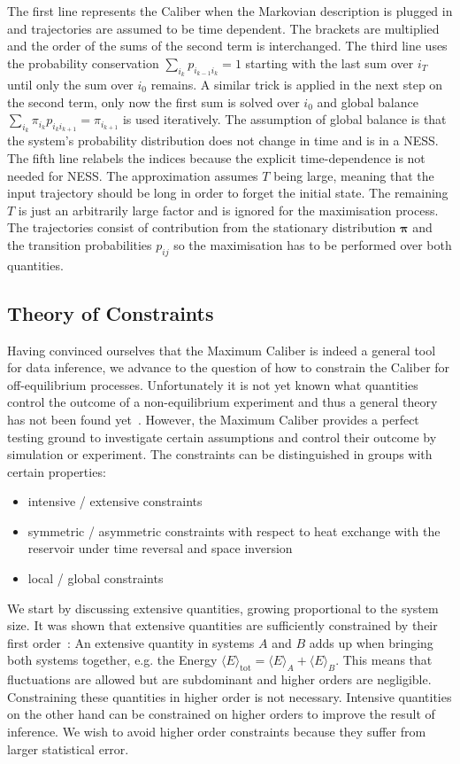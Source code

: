 The first line represents the Caliber when the Markovian description is plugged in and trajectories are assumed to be time dependent. The brackets are multiplied and the order of the sums of the second term is interchanged. The third line uses the probability conservation $\sum_{i_{k}} p_{i_{k-1} i_{k}} =1$ starting with the last sum over $i_T$ until only the sum over $i_0$ remains. A similar trick is applied in the next step on the second term, only now the first sum is solved over $i_0$ and global balance $\sum_{i_{k}} \pi_{i_k} p_{i_{k} i_{k+1}} = \pi_{i_{k+1}}$ is used iteratively. The assumption of global balance is that the system's probability distribution does not change in time and is in a NESS. The fifth line relabels the indices because the explicit time-dependence is not needed for NESS. The approximation assumes $T$ being large, meaning that the input trajectory should be long in order to forget the initial state. The remaining $T$ is just an arbitrarily large factor and is ignored for the maximisation process. The trajectories consist of contribution from the stationary distribution $\bm{\pi}$ and the transition probabilities $p_{ij}$ so the maximisation has to be performed over both quantities.  


\subsection{Theory of Constraints}
Having convinced ourselves that the Maximum Caliber is indeed a general tool for data inference, we advance to the question of how to constrain the Caliber for off-equilibrium processes. Unfortunately it is not yet known what quantities control the outcome of a non-equilibrium experiment and thus a general theory has not been found yet~\cite{maes2018non}. However, the Maximum Caliber provides a perfect testing ground to investigate certain assumptions and control their outcome by simulation or experiment. The constraints can be distinguished in groups with certain properties:
\begin{itemize}
 \item intensive / extensive constraints
 \item symmetric / asymmetric constraints with respect to heat exchange with the reservoir under time reversal and space inversion
 \item local / global constraints 
\end{itemize}
We start by discussing extensive quantities, growing proportional to the system size. It was shown that extensive quantities are sufficiently constrained by their first order~\cite{dixit2018perspective}: An extensive quantity in systems $A$ and $B$ adds up when bringing both systems together, e.g. the Energy
$\langle E \rangle_{\text{tot}} = \langle E \rangle_{A} + \langle E \rangle_{B}$. 
This means that fluctuations are allowed but are subdominant and higher orders 
are negligible. Constraining these quantities in higher order is not necessary. Intensive quantities on the other hand can be constrained on higher orders to improve the result of inference. We wish to avoid higher order constraints because they suffer from larger statistical error. 

